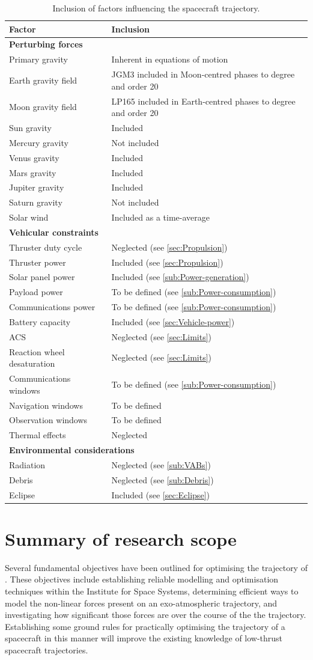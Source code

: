 \begin{table}
\centering
\caption{Inclusion of factors influencing the spacecraft trajectory.} \label{tab:Scope-limitations}
\begin{tabular}{p{} p{}} \toprule
Factor & Inclusion \tabularnewline\midrule
\textbf{Perturbing forces} \tabularnewline
Primary gravity & Inherent in equations of motion \tabularnewline
Earth gravity field & JGM3 included in Moon-centred phases to degree and order 20\tabularnewline
Moon gravity field & LP165 included in Earth-centred phases to degree and order 20\tabularnewline
Sun gravity & Included \tabularnewline
Mercury gravity & Not included \tabularnewline
Venus gravity & Included \tabularnewline
Mars gravity & Included \tabularnewline
Jupiter gravity & Included \tabularnewline
Saturn gravity & Not included \tabularnewline
Solar wind & Included as a time-average \tabularnewline
\textbf{Vehicular constraints} \tabularnewline
Thruster duty cycle & Neglected (see \autoref{sec:Propulsion}) \tabularnewline
Thruster power & Included (see \autoref{sec:Propulsion}) \tabularnewline
Solar panel power & Included (see \autoref{sub:Power-generation}) \tabularnewline
Payload power & To be defined (see \autoref{sub:Power-consumption}) \tabularnewline
Communications power & To be defined (see \autoref{sub:Power-consumption}) \tabularnewline
Battery capacity & Included (see \autoref{sec:Vehicle-power}) \tabularnewline
ACS & Neglected (see \autoref{sec:Limits}) \tabularnewline
Reaction wheel desaturation & Neglected (see \autoref{sec:Limits})\tabularnewline
Communications windows & To be defined (see \autoref{sub:Power-consumption}) \tabularnewline
Navigation windows & To be defined \tabularnewline
Observation windows & To be defined \tabularnewline
Thermal effects & Neglected \tabularnewline\midrule
\multicolumn{2}{l}{\textbf{Environmental considerations}} \tabularnewline
Radiation & Neglected (see \autoref{sub:VABs}) \tabularnewline
Debris & Neglected (see \autoref{sub:Debris}) \tabularnewline
Eclipse & Included (see \autoref{sec:Eclipse}) \tabularnewline
\bottomrule
\end{tabular}
\end{table}

\section{Summary of research scope} \label{sec:Objective-summary}

Several fundamental objectives have been outlined for optimising the trajectory of \BW. These objectives include establishing reliable modelling and optimisation techniques within the Institute for Space Systems, determining efficient ways to model the non-linear forces present on an exo-atmospheric trajectory, and investigating how significant those forces are over the course of the the trajectory. Establishing some ground rules for practically optimising the trajectory of a spacecraft in this manner will improve the existing knowledge of low-thrust spacecraft trajectories.